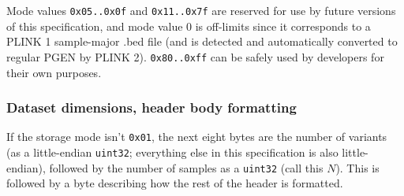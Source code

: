 \documentclass[8pt]{article}
\begin{document}
Mode values \texttt{0x05..0x0f} and \texttt{0x11..0x7f} are reserved for use by
future versions of this specification, and mode value 0 is off-limits since it
corresponds to a PLINK 1 sample-major .bed file (and is detected and
automatically converted to regular PGEN by PLINK 2).  \texttt{0x80..0xff} can
be safely used by developers for their own purposes.

\subsubsection{Dataset dimensions, header body formatting}

If the storage mode isn't \texttt{0x01}, the next eight bytes are the number of
variants (as a little-endian \texttt{uint32}; everything else in this
specification is also little-endian), followed by the number of samples as a
\texttt{uint32} (call this $N$).  This is followed by a byte describing how the
rest of the header is formatted.
\end{document}
